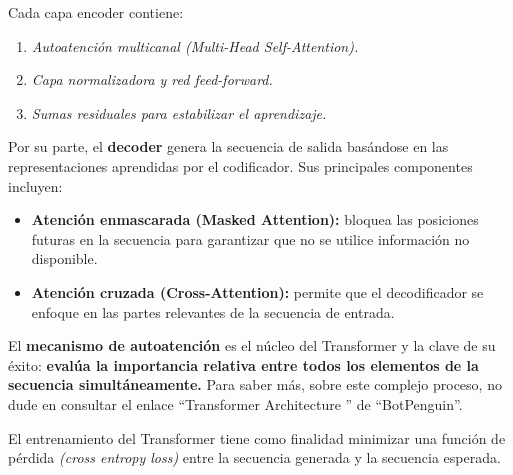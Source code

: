 Cada capa encoder contiene:
\begin{enumerate}
    \item \textit{Autoatención multicanal (Multi-Head Self-Attention).}
    \item \textit{Capa normalizadora y red feed-forward.}
    \item \textit{Sumas residuales para estabilizar el aprendizaje.}
\end{enumerate}

Por su parte, el \textbf{decoder} genera la secuencia de salida basándose en las representaciones aprendidas por el codificador. Sus principales componentes incluyen:
\begin{itemize}
    \item \textbf{Atención enmascarada (Masked Attention):} bloquea las posiciones futuras en la secuencia para garantizar que no se utilice información no disponible.
    \item \textbf{Atención cruzada (Cross-Attention):} permite que el decodificador se enfoque en las partes relevantes de la secuencia de entrada.
\end{itemize}

El \textbf{mecanismo de autoatención} es el núcleo del Transformer y la clave de su éxito: \textbf{evalúa la importancia relativa entre todos los elementos de la secuencia simultáneamente.} Para saber más, sobre este complejo proceso, no dude en consultar el enlace ``Transformer Architecture '' de ``BotPenguin''\cite{botpenguin2025}.

El entrenamiento del Transformer tiene como finalidad minimizar una función de pérdida \emph{(cross entropy loss)} entre la secuencia generada y la secuencia esperada.

